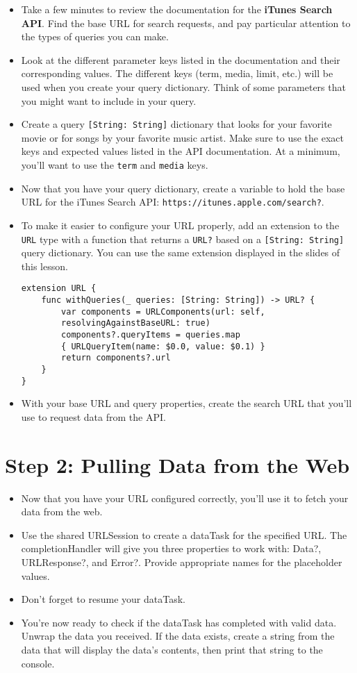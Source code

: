 \documentclass[a4paper,11pt]{scrartcl}
\begin{document}
\begin{itemize}
\item Take a few minutes to review the documentation for the \textbf{iTunes Search API}. Find the base URL for search requests, and pay particular attention to the types of queries you can make. 
\item Look at the different parameter keys listed in the documentation and their corresponding values. The different keys (term, media, limit, etc.) will be used when you create your query dictionary. Think of some parameters that you might want to include in your query. 
\item Create a query \texttt{[String: String]} dictionary that looks for your favorite movie or for songs by your favorite music artist. Make sure to use the exact keys and expected values listed in the API documentation. At a minimum, you'll want to use the \texttt{term} and \texttt{media} keys.
\item Now that you have your query dictionary, create a variable to hold the base URL for the iTunes Search API: \texttt{https://itunes.apple.com/search?}.
\item To make it easier to configure your URL properly, add an extension to the \texttt{URL} type with a function that returns a \texttt{URL?} based on a \texttt{[String: String]} query dictionary. You can use the same extension displayed in the slides of this lesson.
\begin{lstlisting}
extension URL {
    func withQueries(_ queries: [String: String]) -> URL? {
        var components = URLComponents(url: self,
        resolvingAgainstBaseURL: true)
        components?.queryItems = queries.map
        { URLQueryItem(name: $0.0, value: $0.1) }
        return components?.url
    }
}
\end{lstlisting}
\item With your base URL and query properties, create the search URL that you'll use to request data from the API.
\end{itemize}

\section*{Step 2: Pulling Data from the Web}

\begin{itemize}
\item Now that you have your URL configured correctly, you'll use it to fetch your data from the web. 
\item Use the shared URLSession to create a dataTask for the specified URL. The completionHandler will give you three properties to work with: Data?, URLResponse?, and Error?. Provide appropriate names for the placeholder values.
\item Don't forget to resume your dataTask.
\item You're now ready to check if the dataTask has completed with valid data. Unwrap the data you received. If the data exists, create a string from the data that will display the data's contents, then print that string to the console. 
\end{itemize}
\end{document}
